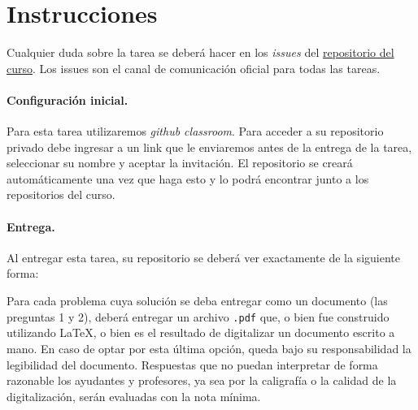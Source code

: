 
\section*{Instrucciones}

Cualquier duda sobre la tarea se deberá hacer en los \emph{issues} del \href{https://github.com/IIC3253/2026}{repositorio del curso}. Los issues son el canal de comunicación oficial para todas las tareas.

\paragraph{Configuración inicial.} 
Para esta tarea utilizaremos \textit{github classroom}. 
Para acceder a su repositorio privado debe ingresar a un link que le enviaremos antes de la entrega de la tarea, seleccionar su nombre y aceptar la invitación.
El repositorio se creará automáticamente una vez que haga esto y lo podrá encontrar junto a los repositorios del curso.

\paragraph{Entrega.} Al entregar esta tarea, su repositorio se deberá ver exactamente de la siguiente forma:

\bigskip


\bigskip

Para cada problema cuya solución se deba entregar como un documento (las preguntas 1 y 2), deberá entregar un archivo \texttt{.pdf} que, o bien fue construido utilizando \LaTeX, o bien es el resultado de digitalizar un documento escrito a mano. En caso de optar por esta última opción, queda bajo su responsabilidad la legibilidad del documento. Respuestas que no puedan interpretar de forma razonable los ayudantes y profesores, ya sea por la caligrafía o la calidad de la digitalización, serán evaluadas con la nota mínima.
